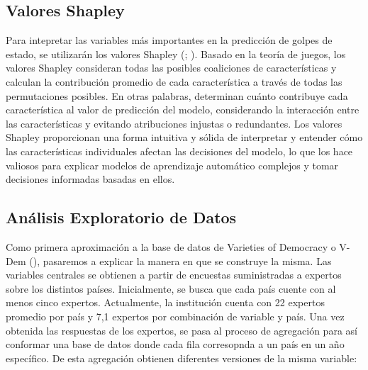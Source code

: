 \documentclass{article}
\begin{document}
\subsection{Valores Shapley}
Para intepretar las variables más importantes en la predicción de golpes de estado, se 
utilizarán los valores Shapley (\cite{Str10}; \cite{Lun17}). Basado en la teoría de 
juegos, los valores Shapley  consideran todas las posibles coaliciones de características 
y calculan la contribución promedio de cada característica a través de todas las 
permutaciones posibles. En otras palabras, determinan cuánto contribuye cada 
característica al valor de predicción del modelo, considerando la interacción entre las 
características y evitando atribuciones injustas o redundantes. Los valores Shapley
proporcionan una forma intuitiva y sólida de interpretar y entender cómo las 
características individuales afectan las decisiones del modelo, lo que los hace valiosos 
para explicar modelos de aprendizaje automático complejos y tomar decisiones informadas 
basadas en ellos.

\subsection{Análisis Exploratorio de Datos}
Como primera aproximación a la base de datos de Varieties of Democracy o V-Dem 
(\cite{CopMet24}), pasaremos a explicar la manera en que se construye la misma. Las
variables centrales se obtienen a partir de encuestas suministradas a expertos
sobre los distintos países. Inicialmente, se busca que cada país cuente con al menos
cinco expertos. Actualmente, la institución cuenta con 22 expertos promedio por país
y 7,1 expertos por combinación de variable y país. Una vez obtenida las respuestas
de los expertos, se pasa al proceso de agregación para así conformar una base de 
datos donde cada fila corresopnda a un país en un año específico. De esta agregación
obtienen diferentes versiones de la misma variable:
\end{document}
